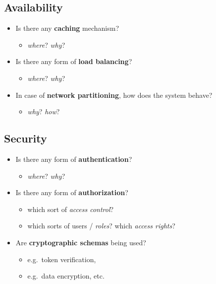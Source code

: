\documentclass{scrartcl}
\begin{document}
\subsection{Availability}\label{availability}

\begin{itemize}
  \item Is there any \textbf{caching} mechanism?

  \begin{itemize}
    \item \emph{where}? \emph{why}?
  \end{itemize}
  \item Is there any form of \textbf{load balancing}?

  \begin{itemize}
    \item \emph{where}? \emph{why}?
  \end{itemize}
  \item In case of \textbf{network partitioning}, how does the system behave?

  \begin{itemize}
    \item \emph{why}? \emph{how}?
  \end{itemize}
\end{itemize}

\subsection{Security}\label{security}

\begin{itemize}
  \item Is there any form of \textbf{authentication}?

  \begin{itemize}
    \item \emph{where}? \emph{why}?
  \end{itemize}
  \item Is there any form of \textbf{authorization}?

  \begin{itemize}
    \item which sort of \emph{access control}?
    \item which sorts of users / \emph{roles}? which \emph{access rights}?
  \end{itemize}
  \item Are \textbf{cryptographic schemas} being used?

  \begin{itemize}
    \item e.g.~token verification,
    \item e.g.~data encryption, etc.
  \end{itemize}
\end{itemize}
\end{document}
